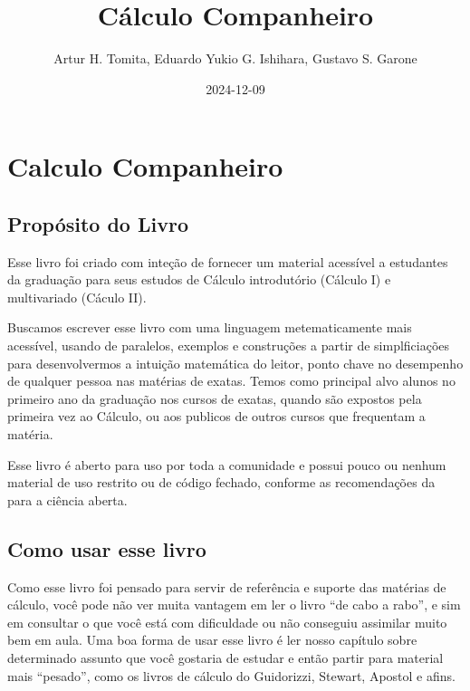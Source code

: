 \documentclass[
  letterpaper,
  DIV=11,
  numbers=noendperiod]{scrreprt}
\title{Cálculo Companheiro}
\author{Artur H. Tomita, Eduardo Yukio G. Ishihara, Gustavo S. Garone}
\date{2024-12-09}
\renewcommand*\contentsname{Índice}
\newcommand\contentsname{Índice}
\begin{document}
\maketitle

\renewcommand*\contentsname{Índice}
{
\hypersetup{linkcolor=}
\setcounter{tocdepth}{2}
\tableofcontents
}


\chapter*{Calculo Companheiro}\label{calculo-companheiro}


\section*{Propósito do Livro}\label{propuxf3sito-do-livro}


Esse livro foi criado com inteção de fornecer um material acessível a
estudantes da graduação para seus estudos de Cálculo introdutório
(Cálculo I) e multivariado (Cáculo II).

Buscamos escrever esse livro com uma linguagem metematicamente mais
acessível, usando de paralelos, exemplos e construções a partir de
simplficiações para desenvolvermos a intuição matemática do leitor,
ponto chave no desempenho de qualquer pessoa nas matérias de exatas.
Temos como principal alvo alunos no primeiro ano da graduação nos cursos
de exatas, quando são expostos pela primeira vez ao Cálculo, ou aos
publicos de outros cursos que frequentam a matéria.

Esse livro é aberto para uso por toda a comunidade e possui pouco ou
nenhum material de uso restrito ou de código fechado, conforme as
recomendações da \textcite{unesco_recomendacao_2022} para a ciência
aberta.

\section*{Como usar esse livro}\label{como-usar-esse-livro}


Como esse livro foi pensado para servir de referência e suporte das
matérias de cálculo, você pode não ver muita vantagem em ler o livro
``de cabo a rabo'', e sim em consultar o que você está com dificuldade
ou não conseguiu assimilar muito bem em aula. Uma boa forma de usar esse
livro é ler nosso capítulo sobre determinado assunto que você gostaria
de estudar e então partir para material mais ``pesado'', como os livros
de cálculo do Guidorizzi, Stewart, Apostol e afins.
\end{document}
